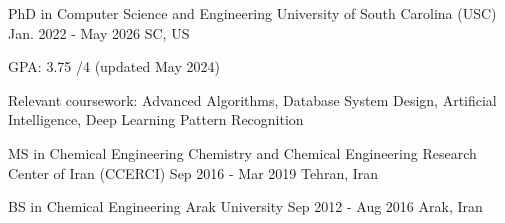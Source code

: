 {}


\begin{cventries}

  \cventry
    {PhD in Computer Science and Engineering}   %
    {University of South Carolina (USC)}        %
    {Jan. 2022 - May 2026}                      %
    {SC, US}                                   %
    {
      \begin{cvitems}                           %
        \item {GPA: 3.75 /4 (updated May 2024)}
        \item {Relevant coursework: Advanced Algorithms, Database System Design, Artificial Intelligence, Deep Learning Pattern Recognition}
      \end{cvitems}
    }

\vspace{-0.06cm}
\cventry
    {MS in Chemical Engineering}
    {Chemistry and Chemical Engineering Research Center of Iran (CCERCI)}
    {Sep 2016 - Mar 2019}
    {Tehran, Iran}
    {
    }

\vspace{-0.45cm}
\cventry
    {BS in Chemical Engineering}
    {Arak University}
    {Sep 2012 - Aug 2016}
    {Arak, Iran}
    {
    }

\end{cventries}
